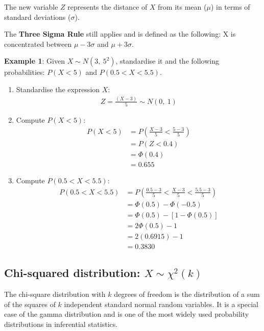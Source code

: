 \documentclass[10pt,a4paper]{article}
\begin{document}
The new variable $Z$ represents the distance of $X$ from its mean ($\mu$) in terms of standard
deviations ($\sigma$).

The \textbf{Three Sigma Rule} still applies and is defined as the following: X is concentrated
between $\mu - 3\sigma$ and $\mu + 3\sigma$.

\textbf{Example 1}: Given $X \sim N(3,\:5^2)$, standardise it and the following probabilities:
$P(X<5)$ and $P(0.5<X<5.5)$.
\begin{enumerate}
    \item Standardise the expression $X$:
    \begin{align*}
        Z = \frac{(X-3)}{5} \sim N(0,\: 1)
    \end{align*}

    \item Compute $P(X<5)$: 
    \begin{align*}
        P(X<5) &= P\left(\frac{X-3}{5}<\frac{5-3}{5}\right) \\
        &= P(Z<0.4) \\
        &= \Phi(0.4) \\
        &= 0.655
    \end{align*}

    \item Compute $P(0.5 < X < 5.5)$:
    \begin{align*}
        P(0.5 < X < 5.5) &= P\left(\frac{0.5-3}{5}<\frac{X-3}{5}<\frac{5.5-3}{5}\right) \\
        &= \Phi(0.5) - \Phi(-0.5) \\
        &= \Phi(0.5) - [1-\Phi(0.5)] \\ 
        &= 2\Phi(0.5) - 1 \\
        &= 2(0.6915) - 1 \\
        &= 0.3830
    \end{align*}
\end{enumerate}

\subsection{Chi-squared distribution: $X \sim \chi^2(k)$}

The chi-square distribution with $k$ degrees of freedom is the distribution of a sum of the squares
of $k$ independent standard normal random variables. It is a special case of the gamma distribution
and is one of the most widely used probability distributions in inferential statistics.
\end{document}
